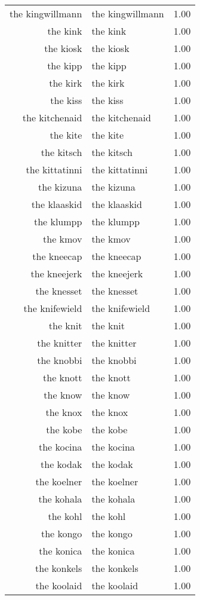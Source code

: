 \begin{table}[ht]
\begin{tabular}{rlr}
  the kingwillmann & the kingwillmann & 1.00 \\ 
  the kink & the kink & 1.00 \\ 
  the kiosk & the kiosk & 1.00 \\ 
  the kipp & the kipp & 1.00 \\ 
  the kirk & the kirk & 1.00 \\ 
  the kiss & the kiss & 1.00 \\ 
  the kitchenaid & the kitchenaid & 1.00 \\ 
  the kite & the kite & 1.00 \\ 
  the kitsch & the kitsch & 1.00 \\ 
  the kittatinni & the kittatinni & 1.00 \\ 
  the kizuna & the kizuna & 1.00 \\ 
  the klaaskid & the klaaskid & 1.00 \\ 
  the klumpp & the klumpp & 1.00 \\ 
  the kmov & the kmov & 1.00 \\ 
  the kneecap & the kneecap & 1.00 \\ 
  the kneejerk & the kneejerk & 1.00 \\ 
  the knesset & the knesset & 1.00 \\ 
  the knifewield & the knifewield & 1.00 \\ 
  the knit & the knit & 1.00 \\ 
  the knitter & the knitter & 1.00 \\ 
  the knobbi & the knobbi & 1.00 \\ 
  the knott & the knott & 1.00 \\ 
  the know & the know & 1.00 \\ 
  the knox & the knox & 1.00 \\ 
  the kobe & the kobe & 1.00 \\ 
  the kocina & the kocina & 1.00 \\ 
  the kodak & the kodak & 1.00 \\ 
  the koelner & the koelner & 1.00 \\ 
  the kohala & the kohala & 1.00 \\ 
  the kohl & the kohl & 1.00 \\ 
  the kongo & the kongo & 1.00 \\ 
  the konica & the konica & 1.00 \\ 
  the konkels & the konkels & 1.00 \\ 
  the koolaid & the koolaid & 1.00 \\ 

\end{tabular}
\end{table}
